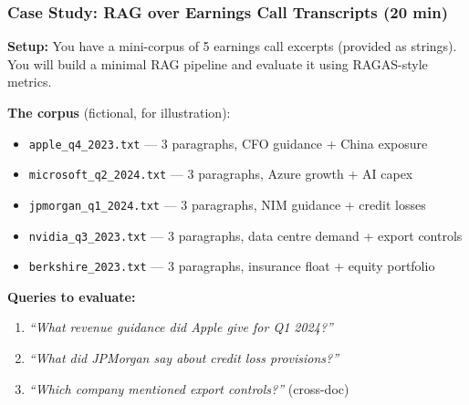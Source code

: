 \documentclass[9pt,t]{beamer}
\begin{document}
\begin{frame}
\frametitle{Case Study: RAG over Earnings Call Transcripts (20 min)}

\textbf{Setup:} You have a mini-corpus of 5 earnings call excerpts (provided as strings).
You will build a minimal RAG pipeline and evaluate it using RAGAS-style metrics.

\medskip
\textbf{The corpus} (fictional, for illustration):
\begin{itemize}
  \item \texttt{apple\_q4\_2023.txt} --- 3 paragraphs, CFO guidance + China exposure
  \item \texttt{microsoft\_q2\_2024.txt} --- 3 paragraphs, Azure growth + AI capex
  \item \texttt{jpmorgan\_q1\_2024.txt} --- 3 paragraphs, NIM guidance + credit losses
  \item \texttt{nvidia\_q3\_2023.txt} --- 3 paragraphs, data centre demand + export controls
  \item \texttt{berkshire\_2023.txt} --- 3 paragraphs, insurance float + equity portfolio
\end{itemize}

\medskip
\textbf{Queries to evaluate:}
\begin{enumerate}
  \item \textit{``What revenue guidance did Apple give for Q1 2024?''}
  \item \textit{``What did JPMorgan say about credit loss provisions?''}
  \item \textit{``Which company mentioned export controls?''} (cross-doc)
\end{enumerate}
\end{frame}
\end{document}

